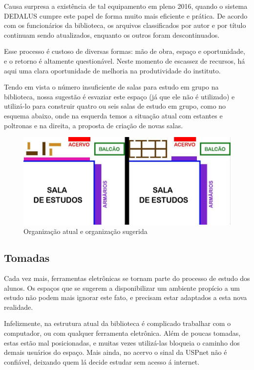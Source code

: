 \documentclass[titlepage]{article}
\begin{document}
Causa surpresa a existência de tal equipamento em pleno 2016, quando o sistema
DEDALUS cumpre este papel de forma muito mais eficiente e prática. De acordo 
com os funcionários da biblioteca, os arquivos classificados por autor e por 
título continuam sendo atualizados, enquanto os outros foram descontinuados.

Esse processo é custoso de diversas formas: mão de obra, espaço e oportunidade,
e o retorno é altamente questionável. Neste momento de escassez de recursos, 
há aqui uma clara oportunidade de melhoria na produtividade do instituto.

Tendo em vista o número insuficiente de salas para estudo em grupo na 
biblioteca, nossa sugestão é esvaziar este espaço (já que ele não é utilizado)
e utilizá-lo para construir quatro ou seis salas de estudo em grupo, como 
no esquema abaixo, onde na esquerda temos a situação atual com estantes e 
poltronas e na direita, a proposta de criação de novas salas.
\begin{figure}[ht!]
\caption{Organização atual e organização sugerida}
\label{fig:projeto}
\centering
\includegraphics[width=1\textwidth]{projeto}
\end{figure}

\subsection{Tomadas}
Cada vez mais, ferramentas eletrônicas se tornam parte do processo de estudo dos
alunos. Os espaços que se sugerem a disponibilizar um ambiente propício a um 
estudo não podem mais ignorar este fato, e precisam estar adaptados a esta nova
realidade.

Infelizmente, na estrutura atual da biblioteca é complicado trabalhar com o
computador, ou com qualquer ferramenta eletrônica. Além de poucas tomadas,
estas estão mal posicionadas, e muitas vezes utilizá-las bloqueia o caminho dos
demais usuários do espaço. Mais ainda, no acervo o sinal da USPnet não é
confiável, deixando quem lá decide estudar sem acesso á internet.
\end{document}

